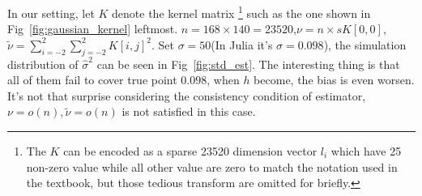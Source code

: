 \documentclass{article}
\begin{document}
In our setting, let $K$ denote the kernel matrix
\footnote{The $K$ can be encoded as a sparse 23520 dimension vector $l_i$ which have 25 non-zero value while all other value are zero to match
the notation used in the textbook, but those tedious transform are omitted for briefly.}
such as the one shown in Fig~\ref{fig:gaussian_kernel} leftmost.
$n = 168 \times 140 = 23520$,$\nu = n \times sK[0,0]$,$\tilde{\nu} = \sum_{i=-2}^2\sum_{j=-2}^2 K[i,j]^2$. Set $\sigma=50$(In Julia it's 
$\sigma=0.098$), the simulation distribution of $\hat{\sigma}^2$ can be seen in Fig~\ref{fig:std_est}. 
The interesting thing is that all of them fail to cover true point $0.098$, when $h$ become, the bias is even worsen. It's not that 
surprise considering the consistency condition of estimator, $\nu=o(n),\tilde{\nu}=o(n)$ is not satisfied in this case.
\end{document}
